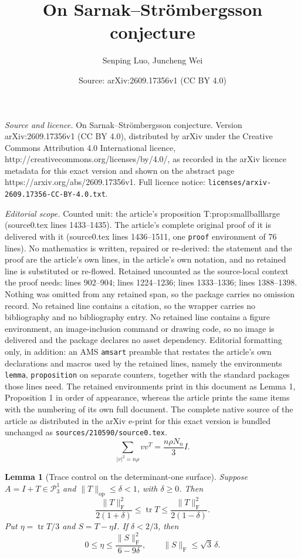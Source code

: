 \documentclass[10pt,a4paper]{amsart}
\title{On Sarnak--Str\"{o}mbergsson conjecture}
\author{Senping Luo, Juncheng Wei}
\date{Source: arXiv:2609.17356v1 (CC BY 4.0)}
\newtheorem{lemma}{Lemma}
\newcommand{\Id}{I}
\newcommand{\PP}{\mathcal P_3^1}
\newcommand{\frob}{\mathrm F}
\newcommand{\op}{\mathrm{op}}
\newcommand{\tr}{\operatorname{tr}}
\begin{document}
\maketitle

\noindent\emph{Source and licence.} On Sarnak--Str\"{o}mbergsson conjecture. Version arXiv:2609.17356v1 (CC BY 4.0), distributed by arXiv under the Creative Commons Attribution 4.0 International licence, http://creativecommons.org/licenses/by/4.0/, as recorded in the arXiv licence metadata for this exact version and shown on the abstract page https://arxiv.org/abs/2609.17356v1. Full licence notice: \texttt{licenses/arxiv-2609.17356-CC-BY-4.0.txt}.\par\smallskip

\noindent\textit{Editorial scope.} Counted unit: the article's proposition T:prop:smallballlarge (source0.tex lines 1433--1435). The article's complete original proof of it is delivered with it (source0.tex lines 1436--1511, one \texttt{proof} environment of 76 lines). No mathematics is written, repaired or re-derived: the statement and the proof are the article's own lines, in the article's own notation, and no retained line is substituted or re-flowed.  Retained uncounted as the source-local context the proof needs: lines 902--904; lines 1224--1236; lines 1333--1336; lines 1388--1398.  Nothing was omitted from any retained span, so the package carries no omission record.  No retained line contains a citation, so the wrapper carries no bibliography and no bibliography entry.  No retained line contains a figure environment, an image-inclusion command or drawing code, so no image is delivered and the package declares no asset dependency.  Editorial formatting only, in addition: an AMS \texttt{amsart} preamble that restates the article's own declarations and macros used by the retained lines, namely the environments \texttt{lemma}, \texttt{proposition} on separate counters, together with the standard packages those lines need.  The retained environments print in this document as Lemma 1, Proposition 1 in order of appearance, whereas the article prints the same items with the numbering of its own full document.  The complete native source of the article as distributed in the arXiv e-print for this exact version is bundled unchanged as \texttt{sources/210590/source0.tex}.
\begin{equation}\label{T:eq:isotropic}
 \sum_{|v|^2=n\rho}vv^T=\frac{n\rho N_n}{3}\Id.
\end{equation}

\begin{lemma}[Trace control on the determinant-one surface]\label{T:lem:det}
Suppose $A=\Id+T\in\PP$ and $\|T\|_{\op}\le\delta<1$, with $\delta\ge0$. Then
\begin{equation}\label{T:eq:tracebounds}
 \frac{\|T\|_{\frob}^2}{2(1+\delta)}
 \le\tr T\le
 \frac{\|T\|_{\frob}^2}{2(1-\delta)}.
\end{equation}
Put $\eta=\tr T/3$ and $S=T-\eta\Id$. If $\delta<2/3$, then
\begin{equation}\label{T:eq:etabounds}
 0\le\eta\le\frac{\|S\|_{\frob}^2}{6-9\delta},
 \qquad \|S\|_{\frob}\le\sqrt3\,\delta.
\end{equation}
\end{lemma}
\end{document}
